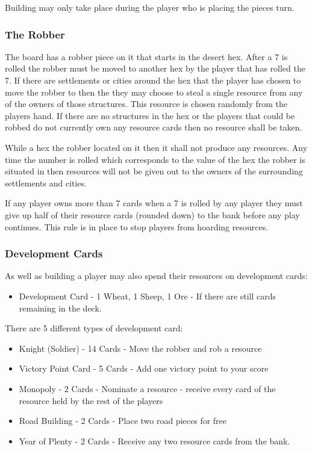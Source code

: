 \documentclass[]{article}
\begin{document}
\par Building may only take place during the player who is placing the pieces turn. 

\subsubsection{The Robber}
The board has a robber piece on it that starts in the desert hex. After a 7 is rolled the robber must be moved to another hex by the player that has rolled the 7. If there are settlements or cities around the hex that the player has chosen to move the robber to then the they may choose to steal a single resource from any of the owners of those structures. This resource is chosen randomly from the players hand. If there are no structures in the hex or the players that could be robbed do not currently own any resource cards then no resource shall be taken.

\par While a hex the robber located on it then it shall not produce any resources. Any time the number is rolled which corresponds to the value of the hex the robber is situated in then resources will not be given out to the owners of the surrounding settlements and cities.

\par If any player owns more than 7 cards when a 7 is rolled by any player they must give up half of their resource cards (rounded down) to the bank before any play continues. This rule is in place to stop players from hoarding resources. 

\subsubsection{Development Cards}
As well as building a player may also spend their resources on development cards:
\begin{itemize}
	\item Development Card - 1 Wheat, 1 Sheep, 1 Ore - If there are still cards remaining in the deck.
\end{itemize}

\par There are 5 different types of development card:

\begin{itemize}
	\item Knight (Soldier) - 14 Cards - Move the robber and rob a resource
	\item Victory Point Card - 5 Cards - Add one victory point to your score
	\item Monopoly - 2 Cards - Nominate a resource - receive every card of the resource held by the rest of the players
	\item Road Building - 2 Cards - Place two road pieces for free
	\item Year of Plenty - 2 Cards - Receive any two resource cards from the bank.
\end{itemize}
\end{document}

